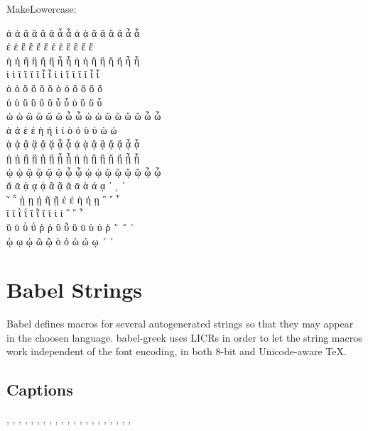 \documentclass[a4paper]{article}
\begin{document}
MakeLowercase:

\MakeLowercase{ ἀ ἁ ἂ ἃ ἄ ἅ ἆ ἇ Ἀ Ἁ Ἂ Ἃ Ἄ Ἅ Ἆ Ἇ }\\
\MakeLowercase{ ἐ ἑ ἒ ἓ ἔ ἕ     Ἐ Ἑ Ἒ Ἓ Ἔ Ἕ     }\\
\MakeLowercase{ ἠ ἡ ἢ ἣ ἤ ἥ ἦ ἧ Ἠ Ἡ Ἢ Ἣ Ἤ Ἥ Ἦ Ἧ }\\
\MakeLowercase{ ἰ ἱ ἲ ἳ ἴ ἵ ἶ ἷ Ἰ Ἱ Ἲ Ἳ Ἴ Ἵ Ἶ Ἷ }\\
\MakeLowercase{ ὀ ὁ ὂ ὃ ὄ ὅ     Ὀ Ὁ Ὂ Ὃ Ὄ Ὅ     }\\
\MakeLowercase{ ὐ ὑ ὒ ὓ ὔ ὕ ὖ ὗ   Ὑ   Ὓ   Ὕ   Ὗ }\\
\MakeLowercase{ ὠ ὡ ὢ ὣ ὤ ὥ ὦ ὧ Ὠ Ὡ Ὢ Ὣ Ὤ Ὥ Ὦ Ὧ }\\
\MakeLowercase{ ὰ ά ὲ έ ὴ ή ὶ ί ὸ ό ὺ ύ ὼ ώ     }\\
\MakeLowercase{ ᾀ ᾁ ᾂ ᾃ ᾄ ᾅ ᾆ ᾇ ᾈ ᾉ ᾊ ᾋ ᾌ ᾍ ᾎ ᾏ }\\
\MakeLowercase{ ᾐ ᾑ ᾒ ᾓ ᾔ ᾕ ᾖ ᾗ ᾘ ᾙ ᾚ ᾛ ᾜ ᾝ ᾞ ᾟ }\\
\MakeLowercase{ ᾠ ᾡ ᾢ ᾣ ᾤ ᾥ ᾦ ᾧ ᾨ ᾩ ᾪ ᾫ ᾬ ᾭ ᾮ ᾯ }\\
\MakeLowercase{ ᾰ ᾱ ᾲ ᾳ ᾴ   ᾶ ᾷ Ᾰ Ᾱ Ὰ Ά ᾼ ᾽ ι ᾿ }\\
\MakeLowercase{ ῀ ῁ ῂ ῃ ῄ   ῆ ῇ Ὲ Έ Ὴ Ή ῌ ῍ ῎ ῏ }\\
\MakeLowercase{ ῐ ῑ ῒ ΐ     ῖ ῗ Ῐ Ῑ Ὶ Ί   ῝ ῞ ῟ }\\
\MakeLowercase{ ῠ ῡ ῢ ΰ ῤ ῥ ῦ ῧ Ῠ Ῡ Ὺ Ύ Ῥ ῭ ΅ ` }\\
\MakeLowercase{     ῲ ῳ ῴ   ῶ ῷ Ὸ Ό Ὼ Ώ ῼ ´ ῾   }

\section{Babel Strings}

Babel defines macros for several autogenerated strings so that they may
appear in the choosen language. babel-greek uses LICRs in order to let the
string macros work independent of the font encoding, in both 8-bit and
Unicode-aware TeX.

\subsection{Captions}

\prefacename,
\refname,
\abstractname,
\bibname,
\chaptername,
\appendixname,
\contentsname,
\listfigurename ,
\listtablename,
\indexname,
\figurename,
\tablename,
\partname,
\enclname,
\ccname,
\headtoname,
\pagename,
\seename,
\alsoname,
\proofname,
\glossaryname,
\end{document}

